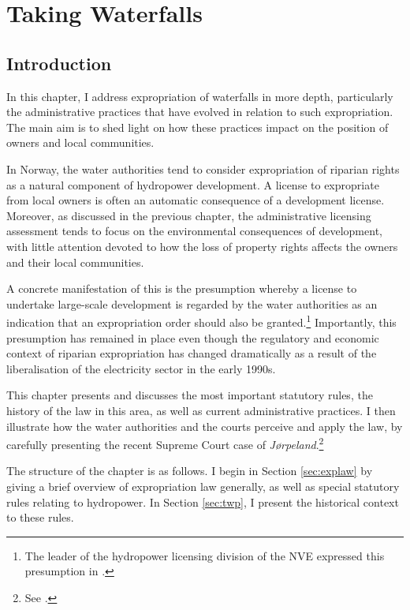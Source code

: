 \chapter{Taking Waterfalls}\label{chap:4}

\section{Introduction}\label{sec:intro4}

In this chapter, I address expropriation of waterfalls in more depth, particularly the administrative practices that have evolved in relation to such expropriation. The main aim is to shed light on how these practices impact on the position of owners and local communities. 

In Norway, the water authorities tend to consider expropriation of riparian rights as a natural component of hydropower development. A license to expropriate from local owners is often an automatic consequence of a development license. Moreover, as discussed in the previous chapter, the administrative licensing assessment tends to focus on the environmental consequences of development, with little attention devoted to how the loss of property rights affects the owners and their local communities.

A concrete manifestation of this is the presumption whereby a license to undertake large-scale development is regarded by the water authorities as an indication that an expropriation order should also be granted.\footnote{The leader of the hydropower licensing division of the NVE expressed this presumption in  \cite{flatby08}.} Importantly, this presumption has remained in place even though the regulatory and economic context of riparian expropriation has changed dramatically as a result of the liberalisation of the electricity sector in the early 1990s. 

This chapter presents and discusses the most important statutory rules, the history of the law in this area, as well as current administrative practices. I then illustrate how the water authorities and the courts perceive and apply the law, by carefully presenting the recent Supreme Court case of {\it Jørpeland}.\footnote{See \cite{jorpeland11}.}

The structure of the chapter is as follows. I begin in Section \ref{sec:explaw} by giving a brief overview of expropriation law generally, as well as special statutory rules relating to hydropower. In Section \ref{sec:twp}, I present the historical context to these rules. %


